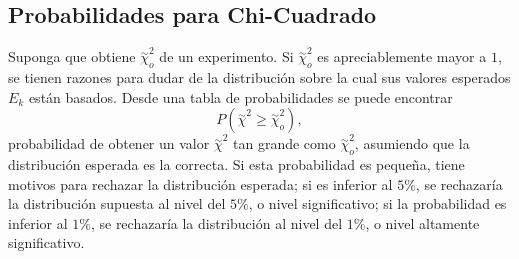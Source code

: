 \subsection{Probabilidades para Chi-Cuadrado}
Suponga que obtiene $\overset{\sim}{\chi} _o ^2$ de un experimento. Si $\overset{\sim}{\chi} _o ^2$ es apreciablemente mayor a $1$, se tienen razones para dudar de la distribución sobre la cual sus valores esperados $E_k$ están basados. Desde una tabla de probabilidades se puede encontrar
	\begin{equation}
		P(\overset{\sim}{\chi} ^2 \geq \overset{\sim}{\chi} _o ^2),
	\end{equation}
probabilidad de obtener un valor $\overset{\sim}{\chi} ^2$ tan grande como $\overset{\sim}{\chi} _o ^2$, asumiendo que la distribución esperada es la correcta. Si esta probabilidad es pequeña, tiene motivos para rechazar la distribución esperada; si es inferior al $5\%$, se rechazaría la distribución supuesta al nivel del $5\%$, o nivel significativo; si la probabilidad es inferior al $1\%$, se rechazaría la distribución al nivel del $1\%$, o nivel altamente significativo.
























